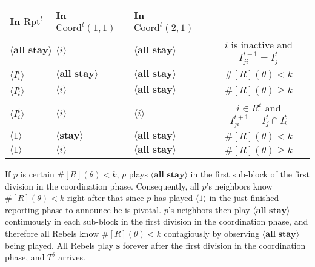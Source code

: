 \documentclass[12pt,letter]{article}
\newcommand{\Kappa}{\mathrm{Coord}}
\newcommand{\Omicron}{\mathrm{Rpt}}
\theoremstyle{definition}
\theoremstyle{remark}
\theoremstyle{claim}
\begin{document}
\begin{table}[!htbp]
\begin{center}
\begin{tabular}{l l l | c}
\hline
\hline
In $\Omicron^t$			&	In $\Kappa^t(1,1)$			&			In $\Kappa^t(2,1)$		&   \\
\hline
$\langle \textbf{all stay} \rangle$  & $\langle i \rangle$	&  $\langle \textbf{all stay} \rangle$ &  $i$ is inactive and $I^{t+1}_{ji}=I^t_j$  \\
$\langle I^t_{i} \rangle$  & $\langle \textbf{all stay} \rangle$	&  $\langle \textbf{all stay} \rangle$ &  $\#[R](\theta)< k$ \\
$\langle I^t_{i} \rangle$  & $\langle i \rangle$	&  $\langle \textbf{all stay} \rangle$ &  $\#[R](\theta)\geq k$ \\
$\langle I^t_{i} \rangle$  & $\langle i \rangle$	&  $\langle i \rangle$ &  $i\in R^t$ and $I^{t+1}_{ji}=I^t_j\cap I^t_{i}$ \\
$\langle 1 \rangle$  & $\langle \textbf{stay} \rangle$	&	$\langle \textbf{all stay} \rangle$ &  $\#[R](\theta)< k$    \\
$\langle 1 \rangle$  & $\langle i \rangle$	&	$\langle \textbf{all stay} \rangle$ &  $\#[R](\theta)\geq k$  \\
  \hline
\end{tabular}
\end{center}
\end{table}


If $p$ is certain $\#[R](\theta)< k$, $p$ plays $\langle \textbf{all stay} \rangle$ in the first sub-block of the first division in the coordination phase. Consequently, all $p$'s neighbors know $\#[R](\theta)< k$ right after that since $p$ has played $\langle 1 \rangle$ in the just finished reporting phase to announce he is pivotal. $p$'s neighbors then play $\langle \textbf{all stay} \rangle$ continuously in each sub-block in the first division in the coordination phase, and therefore all Rebels know $\#[R](\theta)< k$ contagiously by observing $\langle \textbf{all stay} \rangle$ being played. All Rebels play \textbf{s} forever after the first division in the coordination phase, and $T^{\theta}$ arrives. 
\end{document}
